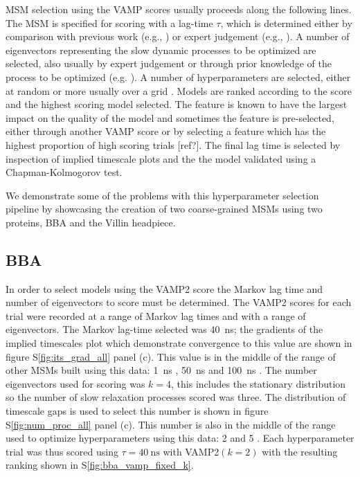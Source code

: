 \documentclass[journal=jacsat,manuscript=article]{achemso}
\newcommand*\sref[1]{%
    S\ref{#1}}
\begin{document}
 MSM selection using the VAMP scores usually proceeds along the following lines. The MSM is specified for scoring with a lag-time $\tau$, which is determined either by comparison with previous work (e.g., \cite{Optimized_2016}) or expert judgement (e.g., \cite{scherer_variational_2019, chen_dynamic_2019}). A number of eigenvectors representing the slow dynamic processes to be optimized are selected, also usually by expert judgement \cite{mcgibbonVariationalCrossvalidationSlow2015, scherer_variational_2019} or through prior knowledge of the process to be optimized (e.g. \cite{Optimized_2016}).  A number of hyperparameters are selected, either at random\cite{Optimized_2016} or more usually over a grid \cite{scherer_variational_2019, chen_dynamic_2019}. Models are ranked according to the score and the highest scoring model selected. The feature is known to have the largest impact on the quality of the model \cite{scherer_variational_2019, Optimized_2016} and sometimes the feature is pre-selected, either through another VAMP score \cite{scherer_variational_2019} or by selecting a feature which has the highest proportion of high scoring trials [ref?].  The final lag time is selected by inspection of implied timescale plots and the the model validated using a Chapman-Kolmogorov test.

We demonstrate some of the problems with this hyperparameter selection pipeline by showcasing the creation  of two coarse-grained MSMs using two proteins, BBA and the Villin headpiece. 

\subsection{BBA}

In order to select models using the VAMP2 score the Markov lag time and number of eigenvectors to score must be determined.  The VAMP2 scores for each trial were recorded at a range of Markov lag times and with a range of eigenvectors. The Markov lag-time selected was \SI{40}{\nano\second}; the gradients of the implied timescales plot which demonstrate convergence to this value are shown in figure \sref{fig:its_grad_all} panel (c). This value is in the middle of the range of other MSMs built using this data: \SI{1}{\nano\second} \cite{Quantitati2018},  \SI{50}{\nano\second} \cite{Optimized_2016} and   \SI{100}{\nano\second} \cite{scherer_variational_2019}. The number eigenvectors used for scoring was $k=4$,  this includes the stationary distribution so the number of slow relaxation processes scored was three. The distribution of timescale gaps is used to select this number is shown in figure \sref{fig:num_proc_all} panel (c).  This number is also in the middle of the range used to optimize hyperparameters using this data: \num{2} \cite{Optimized_2016} and \num{5} \cite{scherer_variational_2019}.  Each hyperparameter trial was thus scored using $\tau=\SI{40}{\nano\second}$ with VAMP2$(k=2)$ with  the resulting ranking shown in \sref{fig:bba_vamp_fixed_k}. 
\end{document}
